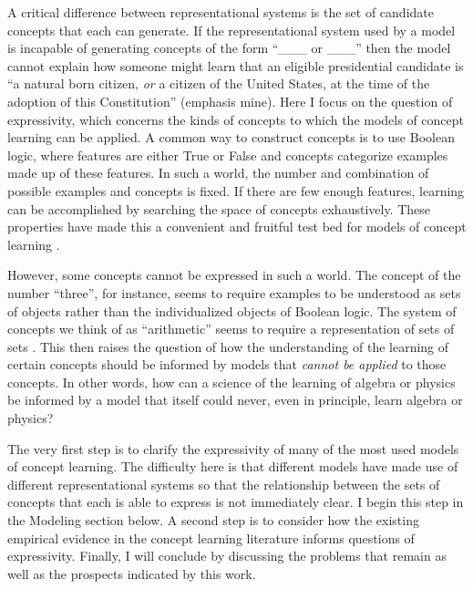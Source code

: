\documentclass[doc,floatsintext]{apa6}
\begin{document}
A critical difference between representational systems is the set of candidate concepts that each can generate.
If the representational system used by a model is incapable of generating concepts of the form ``\_\_\_ or \_\_\_'' then the model cannot explain how someone might learn that an eligible presidential candidate is ``a natural born citizen, \emph{or} a citizen of the United States, at the time of the adoption of this Constitution'' (emphasis mine).
Here I focus on the question of expressivity, which concerns the kinds of concepts to which the models of concept learning can be applied.
A common way to construct concepts is to use Boolean logic, where features are either True or False and concepts categorize examples made up of these features.
In such a world, the number and combination of possible examples and concepts is fixed.
If there are few enough features, learning can be accomplished by searching the space of concepts exhaustively.
These properties have made this a convenient and fruitful test bed for models of concept learning \citep[e.g.][]{brunerga1956,roschm1975,smithm1981,feldman2000}.

However, some concepts cannot be expressed in such a world.
The concept of the number ``three'', for instance, seems to require examples to be understood as sets of objects rather than the individualized objects of Boolean logic.
The system of concepts we think of as ``arithmetic'' seems to require a representation of sets of sets \citet[see][]{searcys2016}.
This then raises the question of how the understanding of the learning of certain concepts should be informed by models that \emph{cannot be applied} to those concepts.
In other words, how can a science of the learning of algebra or physics be informed by a model that itself could never, even in principle, learn algebra or physics?

The very first step is to clarify the expressivity of many of the most used models of concept learning.
The difficulty here is that different models have made use of different representational systems so that the relationship between the sets of concepts that each is able to express is not immediately clear.
I begin this step in the Modeling section below.
A second step is to consider how the existing empirical evidence in the concept learning literature informs questions of expressivity.
Finally, I will conclude by discussing the problems that remain as well as the prospects indicated by this work.


\end{document}
